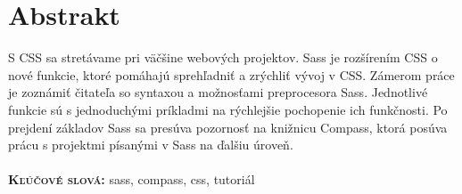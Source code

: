 \chapter*{Abstrakt}
S CSS sa stretávame pri väčšine webových projektov. Sass je rozšírením CSS o nové funkcie, ktoré pomáhajú sprehľadniť a zrýchliť vývoj v CSS. Zámerom práce je zoznámiť čitateľa so syntaxou a možnosťami preprocesora Sass. Jednotlivé funkcie sú s jednoduchými príkladmi na rýchlejšie pochopenie ich funkčnosti. Po prejdení základov Sass sa presúva pozornosť na knižnicu Compass, ktorá posúva prácu s projektmi písanými v Sass na ďalšiu úroveň.  \\ \\
\textbf{\textsc{Kľúčové slová:}} sass, compass, css, tutoriál
